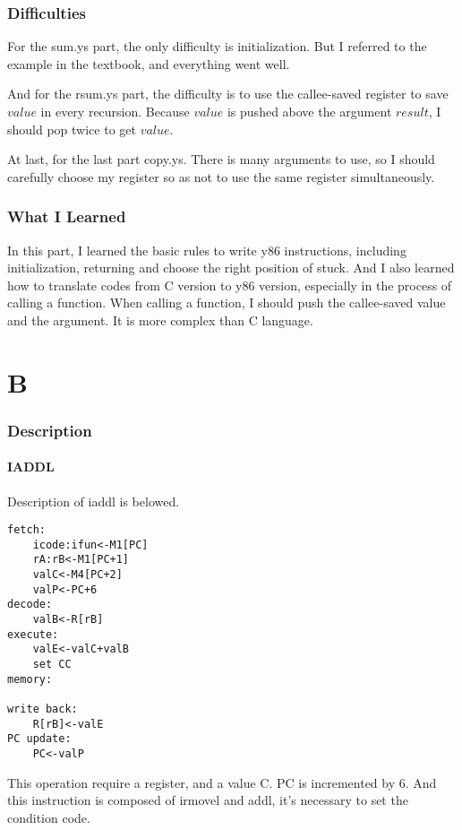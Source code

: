 \documentclass{article}
\begin{document}
\section{Difficulties}
For the sum.ys part, the only difficulty is initialization. But I referred to the example in the textbook, and everything went well.

And for the rsum.ys part, the difficulty is to use the callee-saved register to save $value$ in every recursion. Because $value$ is pushed above the argument $result$, I should pop twice to get $value$.

At last, for the last part copy.ys. There is many arguments to use, so I should carefully choose my register so as not to use the same register simultaneously. 

\section{What I Learned}
 In this part, I learned the basic rules to write y86 instructions, including initialization, returning and choose the right position of stuck. 
 And I also learned how to translate codes from C version to y86 version, especially in the process of calling a function. When calling a function, I should 
 push the callee-saved value and the argument. It is more complex than C language. 
\part{B}
\section{Description}
\subsection{IADDL}
Description of iaddl is belowed.
\begin{lstlisting}
fetch:
    icode:ifun<-M1[PC]
    rA:rB<-M1[PC+1]
    valC<-M4[PC+2]
    valP<-PC+6	
decode:
    valB<-R[rB]
execute:
    valE<-valC+valB
    set CC
memory:

write back:
    R[rB]<-valE
PC update:
    PC<-valP	
\end{lstlisting}
This operation require a register, and a value C. PC is incremented by 6.
And this instruction is composed of irmovel and addl, it's necessary to set the condition code.
\end{document}

